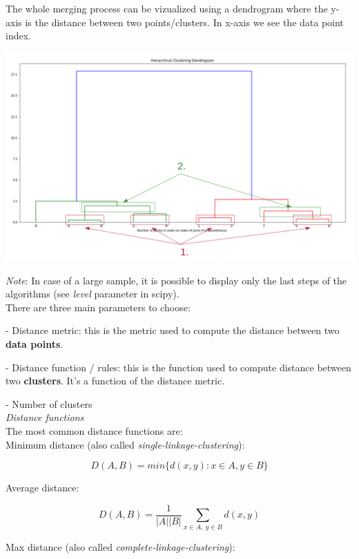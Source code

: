 The whole merging process can be vizualized using a dendrogram where the y-axis is the distance between two points/clusters. In x-axis we see the data point index.

\begin{center}
\includegraphics[scale=0.4]{agg_clustering_dendrogram.png}
\end{center}

\textit{Note}:  In case of a large sample, it is possible to display only the last steps of the algorithms (see \textit{level} parameter in scipy). \\

There are three main parameters to choose:

- Distance metric: this is the metric used to compute the distance between two \textbf{data points}.

- Distance function / rules: this is the function used to compute distance between two \textbf{clusters}. It's a function of the distance metric.

- Number of clusters \\

\textit{Distance functions} \\

The most common distance functions are: \\

Minimum distance (also called \textit{single-linkage-clustering}):

$$D(A,B) = min\{d(x,y): x \in A, y \in B\}$$

Average distance:

$$D(A,B) = \frac{1}{|A| |B|} \sum_{x \in A,~y \in B}d(x,y)$$

Max distance (also called \textit{complete-linkage-clustering}):

